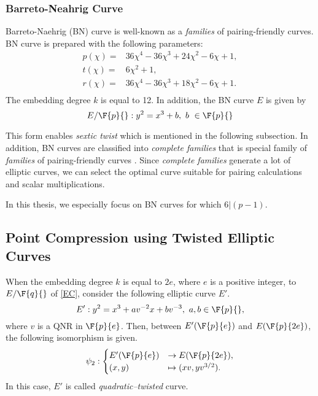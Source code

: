 \subsubsection{Barreto-Neahrig Curve}
Barreto-Naehrig (BN) curve is well-known as a {\it families} of pairing-friendly curves.
BN curve is prepared with the following parameters:
\begin{align*}
p(\chi)=&36\chi^4-36\chi^3+24\chi^2-6\chi+1, \\
t(\chi)=&6\chi^2+1,\\
r(\chi)=&36\chi^4-36\chi^3+18\chi^2-6\chi+1. \\
\end{align*} 
The embedding degree $k$ is equal to 12.
In addition, the BN curve $E$ is given by
\begin{equation}
E/\F{p}{} : y^2 = x^3 + b,\ b\ \in \F{p}{}\nonumber
\end{equation}

This form enables {\em sextic twist} which is mentioned in the following subsection. 
In addition, BN curves are classified into {\it complete families} that is special family of {\it families} of pairing-friendly curves \cite{JC:FreScoTes10}.
Since {\it complete families} generate a lot of elliptic curves, we can select the optimal curve suitable for pairing calculations and scalar multiplications.

In this thesis, we especially focus on BN curves for which $6|(p-1)$.

\subsection{Point Compression using Twisted Elliptic Curves}\label{sec:twist}

When the embedding degree $k$ is equal to $2e$, where $e$ is a positive integer, to $E/\F{q}{}$ of \eqref{EC}, consider the following elliptic curve $E'$.
\begin{equation}
E':y^2=x^3+av^{-2}x+bv^{-3},\ a,b\in \F{p}{}, \label{TEC}
\end{equation}
where $v$ is a QNR in $\F{p}{e}$. Then, between $E'(\F{p}{e})$ and $E(\F{p}{2e})$, the following isomorphism is given.
\begin{eqnarray}
\psi_2 : 
\begin{cases}
E'(\F{p}{e}) & \rightarrow  E(\F{p}{2e}), \\
(x,y) & \mapsto (xv,yv^{3/2}).
\end{cases} \label{2t}
\end{eqnarray}
In this case, $E'$ is called {\it quadratic--twisted} curve.


